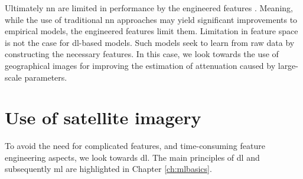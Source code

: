 Ultimately \gls{nn} are limited in performance by the engineered features \cite{Alom2019AArchitectures}. Meaning, while the use of traditional \gls{nn} approaches may yield significant improvements to empirical models, the engineered features limit them. Limitation in feature space is not the case for \gls{dl}-based models. Such models seek to learn from raw data by constructing the necessary features. In this case, we look towards the use of geographical images for improving the estimation of attenuation caused by large-scale parameters.


\section{Use of satellite imagery}

To avoid the need for complicated features, and time-consuming feature engineering aspects, we look towards \gls{dl}. The main principles of \gls{dl} and subsequently \gls{ml} are highlighted in Chapter \ref{ch:mlbasics}. 

